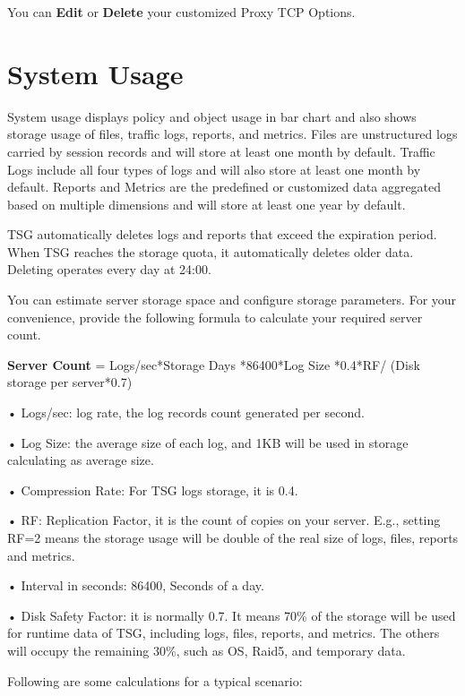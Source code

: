 You can \textbf{Edit} or \textbf{Delete} your customized Proxy TCP Options.

\section*{\hypertarget{link:System Usage}{System Usage}}
\label{sec:setting:usage}

System usage displays policy and object usage in bar chart and also shows storage usage of files, traffic logs, reports, and metrics. 
Files are unstructured logs carried by session records and will store at least one month by default. 
Traffic Logs include all four types of logs and will also store at least one month by default. 
Reports and Metrics are the predefined or customized data aggregated based on multiple dimensions and will store at least one year by default. 


TSG automatically deletes logs and reports that exceed the expiration period. When TSG reaches the storage quota, 
it automatically deletes older data. Deleting operates every day at 24:00. 


You can estimate server storage space and configure storage parameters. For your convenience, provide the following formula to calculate your required server count. 


\textbf{Server Count} = Logs/sec*Storage Days *86400*Log Size *0.4*RF/ (Disk storage per server*0.7)


• Logs/sec: log rate, the log records count generated per second.


• Log Size: the average size of each log, and 1KB will be used in storage calculating as average size.


• Compression Rate: For TSG logs storage, it is 0.4. 


• RF: Replication Factor, it is the count of copies on your server. E.g., setting RF=2 means the storage usage will be double of the real size of logs, files, reports and metrics.


• Interval in seconds: 86400, Seconds of a day.


• Disk Safety Factor: it is normally 0.7. It means 70\% of the storage will be used for runtime data of TSG, including logs, files, reports, and metrics. 
The others will occupy the remaining 30\%, such as OS, Raid5, and temporary data. 


Following are some calculations for a typical scenario:


